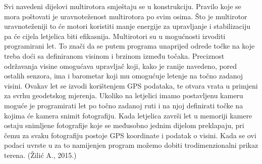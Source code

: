 \documentclass[times, utf8, diplomski]{fer}
\begin{document}
{Svi navedeni dijelovi multirotora smještaju se u konstrukciju. Pravilo koje se  mora poštovati je uravnoteženost multirotora po svim osima. Što je multirotor uravnoteženiji to će motori koristiti manje energije za upravljanje i stabilizaciju pa će cijela letjelica biti efikasnija. Multirotori su u mogućnosti izvoditi programirani let. To znači da se putem programa unaprijed odrede točke na koje treba doći sa definiranom visinom i brzinom između točaka. Preciznost održavanja visine omogućava upravljač koji,  kako  je  ranije  navedeno,  pored  ostalih  senzora, ima i  barometar koji mu omogućuje letenje na  točno zadanoj  visini. Ovakav let se izvodi korištenjem GPS podataka, te otvara vrata u primjeni za svrhu geodetskog mjerenja. Ukoliko na letjelici imamo postavljenu kameru moguće je programirati let po točno zadanoj ruti i na njoj definirati točke na kojima će kamera snimit fotografiju. Kada letjelica završi let u memoriji kamere ostaju snimljene fotografije koje se međusobno jednim dijelom preklapaju, pri čemu za svaku fotografiju postoje GPS koordinate i podatak o visini. Kada se ovi podaci uvrste u za to namijenjen program možemo dobiti trodimenzionalni prikaz terena. (Žilić A., 2015.)



}
\end{document}

